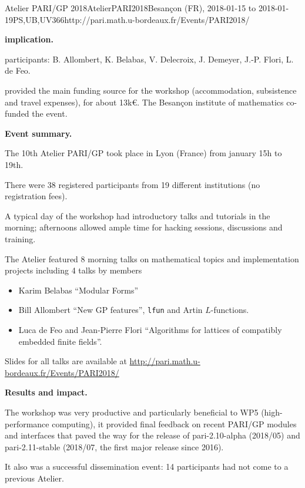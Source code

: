 \begin{event}{Atelier PARI/GP 2018}{AtelierPARI2018}{Besan\c{c}on (FR),
2018-01-15 to 2018-01-19}{PS,UB,UV}{36}{6}{http://pari.math.u-bordeaux.fr/Events/PARI2018/}


\textbf{\ODK implication.}

\ODK participants: B. Allombert, K. Belabas, V. Delecroix, J. Demeyer,
J.-P. Flori, L. de Feo.

\ODK provided the main funding source for the workshop (accommodation,
subsistence and travel expenses), for about 13k\euro. The Besan\c{c}on
institute of mathematics co-funded the event.

\textbf{Event summary.}

The 10th Atelier PARI/GP took place in Lyon (France) from january
15h to 19th.

There were 38 registered participants from 19 different institutions
(no registration fees).

A typical day of the workshop had introductory talks and tutorials
in the morning; afternoons allowed ample time for hacking sessions,
discussions and training.

The Atelier featured 8 morning talks on mathematical topics and
implementation projects including 4 talks by \ODK members
\begin{itemize}
\item Karim Belabas ``Modular Forms''
\item Bill Allombert ``New GP features'', \texttt{lfun} and Artin
  $L$-functions.
\item Luca de Feo and Jean-Pierre Flori ``Algorithms for lattices of
  compatibly embedded finite fields''.
\end{itemize}

Slides for all talks are available at
\url{http://pari.math.u-bordeaux.fr/Events/PARI2018/}

\textbf{Results and impact.}

The workshop was very productive and particularly beneficial to WP5
(high-performance computing), it provided final feedback on recent PARI/GP
  modules and interfaces that paved the way for the release of
  pari-2.10-alpha (2018/05) and pari-2.11-stable (2018/07, the first major
  release since 2016).

It also was a successful dissemination event: 14 participants had not come to
  a previous Atelier.
\end{event}
